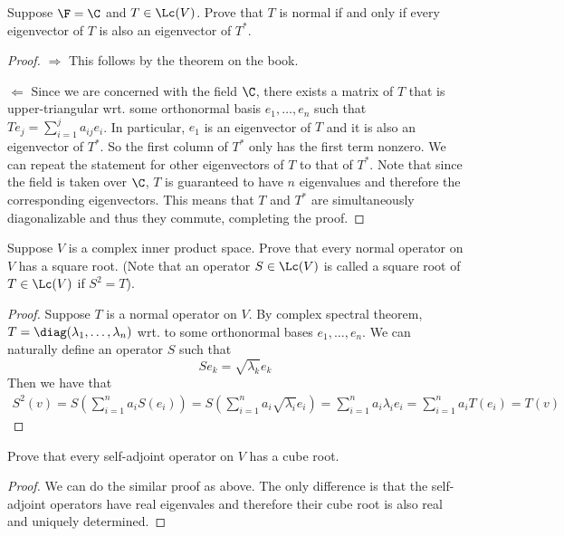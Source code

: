 \documentclass{extarticle}
\begin{document}
\begin{problem}{8}
    Suppose \(\F = \C\) and \(T \in \Lc(V)\). Prove that \(T\) is normal if and only if
    every eigenvector of \(T\) is also an eigenvector of \(T^*\).
\end{problem}

\begin{proof}
\(\Rightarrow\) This follows by the theorem on the book.

\(\Leftarrow\) Since we are concerned with the field \(\C\), there exists a matrix of \(T\) that
is upper-triangular wrt. some orthonormal basis \(e_1, \ldots, e_n\) such that
\(T e_j = \sum_{i=1}^{j} a_{ij} e_i\). In particular, \(e_1\) is an eigenvector of \(T\) and it is
also an eigenvector of \(T^*\). So the first column of \(T^*\) only has the first term nonzero. We can
repeat the statement for other eigenvectors of \(T\) to that of \(T^*\). Note that since the field
is taken over \(\C\), \(T\) is guaranteed to have \(n\) eigenvalues and therefore the corresponding
eigenvectors. This means that \(T\) and \(T^*\) are simultaneously diagonalizable and thus they
commute, completing the proof.
\end{proof}

\begin{problem}{10}
    Suppose \(V\) is a complex inner product space. Prove that every normal operator on \(V\)
    has a square root. (Note that an operator \(S \in \Lc(V)\) is called a square root of \(T
    \in \Lc(V)\) if \(S^2 = T\)).
\end{problem}

\begin{proof}
Suppose \(T\) is a normal operator on \(V\). By complex spectral theorem, \(T = \diag(\lambda_1,
\ldots, \lambda_n)\) wrt. to some orthonormal bases \(e_1, \ldots, e_n\). We can naturally define
an operator \(S\) such that
\[Se_k = \sqrt{\lambda_k} e_k\]
Then we have that
\begin{align*}
    S^2(v) = S\left(\sum_{i=1}^{n} a_i S(e_i)\right) = S\left(\sum_{i=1}^{n} a_i \sqrt{\lambda_i} e_i \right)
    = \sum_{i=1}^{n} a_i \lambda_i e_i = \sum_{i=1}^{n} a_i T(e_i) = T(v)
\end{align*}
\end{proof}

\begin{problem}{11}
    Prove that every self-adjoint operator on \(V\) has a cube root.
\end{problem}

\begin{proof}
We can do the similar proof as above. The only difference is that the self-adjoint operators have
real eigenvales and therefore their cube root is also real and uniquely determined.
\end{proof}
\end{document}

